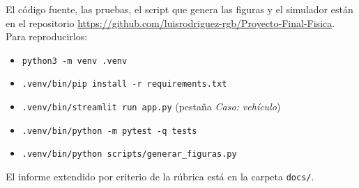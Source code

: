 \documentclass[10pt,onecolumn]{article}
\numberwithin{equation}{section}
\numberwithin{figure}{section}
\numberwithin{table}{section}
\begin{document}
\noindent
El código fuente, las pruebas, el script que genera las figuras y el simulador están en el repositorio
\url{https://github.com/luisrodriguez-rgb/Proyecto-Final-Fisica}. Para reproducirlos:
{\footnotesize
\begin{itemize}
 \item \texttt{python3 -m venv .venv}
 \item \texttt{.venv/bin/pip install -r requirements.txt}
 \item \texttt{.venv/bin/streamlit run app.py} (pestaña \emph{Caso: vehículo})
 \item \texttt{.venv/bin/python -m pytest -q tests}
 \item \texttt{.venv/bin/python scripts/generar\_figuras.py}
\end{itemize}}
\noindent El informe extendido por criterio de la rúbrica está en la carpeta \texttt{docs/}.
\end{document}
